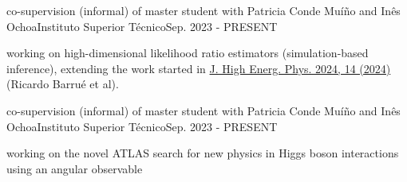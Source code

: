
\begin{cventries}
    {co-supervision (informal) of master student with Patricia Conde Muíño and Inês Ochoa}{Instituto Superior Técnico}{Sep. 2023 - PRESENT}
    {
        \begin{cvitems}
            \item {working on high-dimensional likelihood ratio estimators (simulation-based inference), extending the work started in \href{https://doi.org/10.1007/JHEP04(2024)014}{J. High Energ. Phys. 2024, 14 (2024)} (Ricardo Barrué et al).}
        \end{cvitems}
    }\vspace*{2mm}

    {co-supervision (informal) of master student with Patricia Conde Muíño and Inês Ochoa}{Instituto Superior Técnico}{Sep. 2023 - PRESENT}
    {
        \begin{cvitems}
            \item {working on the novel ATLAS search for new physics in Higgs boson interactions using an angular observable}
        \end{cvitems}
    }
    

\end{cventries}